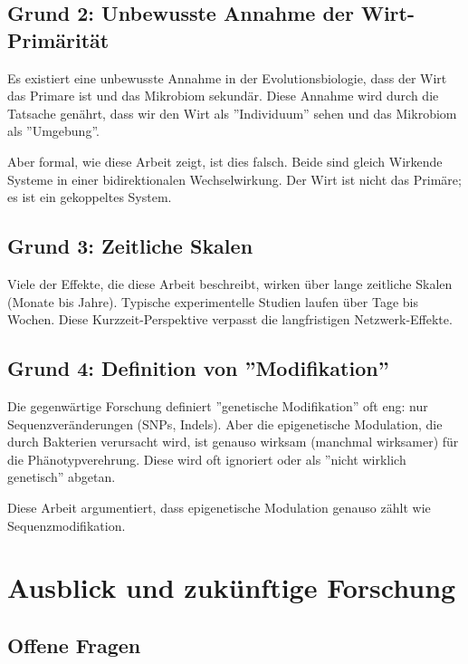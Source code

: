 \documentclass[a4paper,12pt]{article}
\theoremstyle{definition}
\begin{document}
\subsection{Grund 2: Unbewusste Annahme der Wirt-Primärität}

Es existiert eine unbewusste Annahme in der Evolutionsbiologie, dass der Wirt das Primare ist und das Mikrobiom sekundär. Diese Annahme wird durch die Tatsache genährt, dass wir den Wirt als ''Individuum'' sehen und das Mikrobiom als ''Umgebung''.

Aber formal, wie diese Arbeit zeigt, ist dies falsch. Beide sind gleich Wirkende Systeme in einer bidirektionalen Wechselwirkung. Der Wirt ist nicht das Primäre; es ist ein gekoppeltes System.

\subsection{Grund 3: Zeitliche Skalen}

Viele der Effekte, die diese Arbeit beschreibt, wirken über lange zeitliche Skalen (Monate bis Jahre). Typische experimentelle Studien laufen über Tage bis Wochen. Diese Kurzzeit-Perspektive verpasst die langfristigen Netzwerk-Effekte.

\subsection{Grund 4: Definition von ''Modifikation''} 

Die gegenwärtige Forschung definiert ''genetische Modifikation'' oft eng: nur Sequenzveränderungen (SNPs, Indels). Aber die epigenetische Modulation, die durch Bakterien verursacht wird, ist genauso wirksam (manchmal wirksamer) für die Phänotypverehrung. Diese wird oft ignoriert oder als ''nicht wirklich genetisch'' abgetan.

Diese Arbeit argumentiert, dass epigenetische Modulation genauso zählt wie Sequenzmodifikation.

\section{Ausblick und zukünftige Forschung}


\subsection{Offene Fragen}
\end{document}
